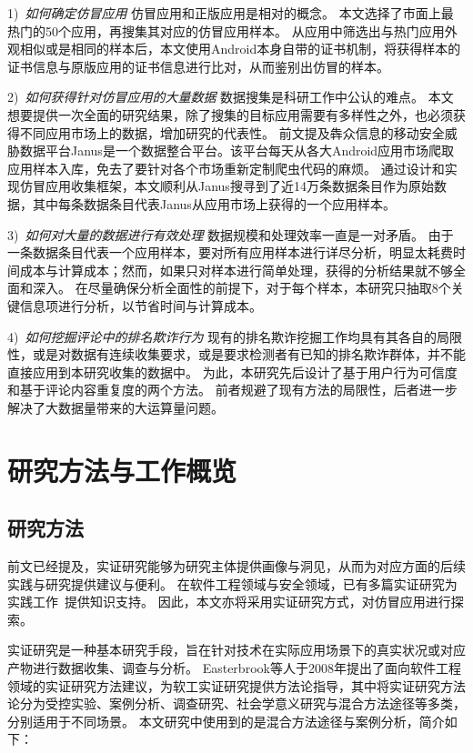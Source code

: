 1)\	\emph{如何确定仿冒应用} \quad
仿冒应用和正版应用是相对的概念。
本文选择了市面上最热门的50个应用，再搜集其对应的仿冒应用样本。
从应用中筛选出与热门应用外观相似或是相同的样本后，本文使用Android本身自带的证书机制，将获得样本的证书信息与原版应用的证书信息进行比对，从而鉴别出仿冒的样本。

2)\	\emph{如何获得针对仿冒应用的大量数据} \quad
数据搜集是科研工作中公认的难点。
本文想要提供一次全面的研究结果，除了搜集的目标应用需要有多样性之外，也必须获得不同应用市场上的数据，增加研究的代表性。
前文提及犇众信息的移动安全威胁数据平台Janus是一个数据整合平台。该平台每天从各大Android应用市场爬取应用样本入库，免去了要针对各个市场重新定制爬虫代码的麻烦。
通过设计和实现仿冒应用收集框架\mytool，本文顺利从Janus搜寻到了近14万条数据条目作为原始数据，其中每条数据条目代表Janus从应用市场上获得的一个应用样本。

3)\	\emph{如何对大量的数据进行有效处理} \quad
数据规模和处理效率一直是一对矛盾。
由于一条数据条目代表一个应用样本，要对所有应用样本进行详尽分析，明显太耗费时间成本与计算成本；然而，如果只对样本进行简单处理，获得的分析结果就不够全面和深入。
在尽量确保分析全面性的前提下，对于每个样本，本研究只抽取8个关键信息项进行分析，以节省时间与计算成本。

4)\ \emph{如何挖掘评论中的排名欺诈行为} \quad
现有的排名欺诈挖掘工作均具有其各自的局限性，或是对数据有连续收集要求，或是要求检测者有已知的排名欺诈群体，并不能直接应用到本研究收集的数据中。
为此，本研究先后设计了基于用户行为可信度和基于评论内容重复度的两个方法。
前者规避了现有方法的局限性，后者进一步解决了大数据量带来的大运算量问题。

\section{研究方法与工作概览}

\subsection{研究方法}
前文已经提及，实证研究能够为研究主体提供画像与洞见，从而为对应方面的后续实践与研究提供建议与便利。
在软件工程领域与安全领域，已有多篇实证研究为实践工作~\cite{Felt2011ASO, Zhou2012DissectingAM, zhou2012hey, rahman2019art, wu2016ji, yang2015xin}提供知识支持。
因此，本文亦将采用实证研究方式，对仿冒应用进行探索。

实证研究是一种基本研究手段，旨在针对技术在实际应用场景下的真实状况或对应产物进行数据收集、调查与分析。
Easterbrook等人于2008年提出了面向软件工程领域的实证研究方法建议\cite{easterbrook2008selecting}，为软工实证研究提供方法论指导，其中将实证研究方法论分为受控实验、案例分析、调查研究、社会学意义研究与混合方法途径等多类，分别适用于不同场景。
本文研究中使用到的是混合方法途径与案例分析，简介如下：

